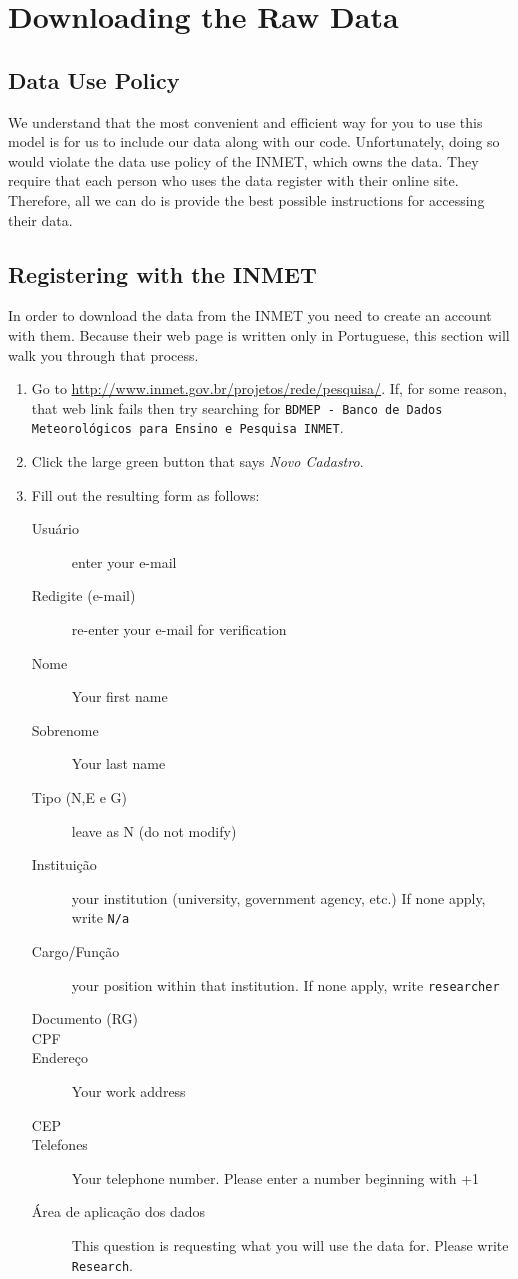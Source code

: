 \documentclass[11pt]{article} %
\newcommand{\code}[1]{\texttt{#1}} %
\newcommand{\usee}[1]{\textit{#1}} %
\begin{document}
\section{Downloading the Raw Data} \label{dload}

\subsection{Data Use Policy}
We understand that the most convenient and efficient way for you to use this model is for us to include our data along with our code.
Unfortunately, doing so would violate the data use policy of the \ac{INMET}, which owns the data.
They require that each person who uses the data register with their online site.
Therefore, all we can do is provide the best possible instructions for accessing their data.

\subsection{Registering with the \acs{INMET}}
In order to download the data from the \ac{INMET} you need to create an account with them.
Because their web page is written only in Portuguese, this section will walk you through that process.

\begin{enumerate}
\item Go to \url{http://www.inmet.gov.br/projetos/rede/pesquisa/}. If, for some reason, that web link fails then try searching for \code{BDMEP - Banco de Dados Meteorol\'{o}gicos para Ensino e Pesquisa INMET}.
\item Click the large green button that says \usee{Novo Cadastro}.
\item Fill out the resulting form as follows:

\begin{description}
\item[Usu\'{a}rio] enter your e-mail	
\item[Redigite (e-mail)] re-enter your e-mail for verification
\item[Nome] Your first name
\item[Sobrenome] Your last name
\item[Tipo (N,E e G)] leave as N (do not modify)
\item[Institui\c{c}\~{a}o] your institution (university, government agency, etc.) If none apply, write \code{N/a}
\item[Cargo/Fun\c{c}\~{a}o] your position within that institution. If none apply, write \code{researcher}
\item[Documento (RG)]
\item[CPF]
\item[Endere\c{c}o] Your work address
\item[CEP]
\item[Telefones] Your telephone number. Please enter a number beginning with +1
\item[\'{A}rea de aplica\c{c}\~{a}o dos dados] This question is requesting what you will use the data for. Please write \code{Research}. 
\end{description}

\end{enumerate}
\end{document}
